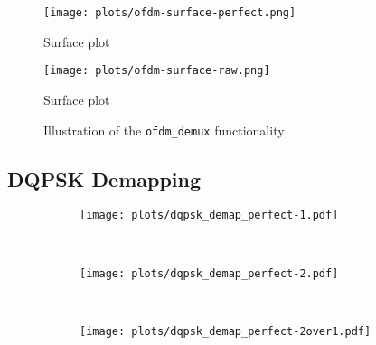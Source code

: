 \documentclass[class=report,11pt,crop=false]{standalone}
\begin{document}
\begin{figure}[htbp]
  \centering
  \captionsetup{type=figure}
  \texttt{[image: plots/ofdm-surface-perfect.png]}
  \caption{Surface plot}
  \label{fig:ofdm-surface-perfect}
\end{figure}

\begin{figure}[htbp]
  \centering
  \captionsetup{type=figure}
  \texttt{[image: plots/ofdm-surface-raw.png]}
  \caption{Surface plot}
  \label{fig:ofdm-surface-raw}
\end{figure}



\begin{figure}[htbp]
  \centering
  \captionsetup{type=figure}
  \def\svgwidth{\linewidth}
  { %
      }
  \caption{Illustration of the \texttt{ofdm\_demux} functionality}
  \label{fig:ofdm_demux}
\end{figure}



\subsection{DQPSK Demapping \label{subsect:dab-proc_dqpsk-demap}}

\begin{figure}[htbp]
  \centering
  \captionsetup{type=figure}
  \begin{subfigure}[t]{0.3\textwidth}
    \centering
    \captionsetup{type=figure}
    \texttt{[image: plots/dqpsk\_demap\_perfect-1.pdf]}
    \caption{}
    \label{fig:dqpsk_demap_perfect-1}
  \end{subfigure}%
  ~ 
  \begin{subfigure}[t]{0.3\textwidth}
    \centering
    \captionsetup{type=figure}
    \texttt{[image: plots/dqpsk\_demap\_perfect-2.pdf]}
    \caption{}
    \label{fig:dqpsk_demap_perfect-2}
  \end{subfigure}
  ~ 
  \begin{subfigure}[t]{0.3\textwidth}
    \centering
    \captionsetup{type=figure}
    \texttt{[image: plots/dqpsk\_demap\_perfect-2over1.pdf]}
    \caption{}
    \label{fig:dqpsk_demap_perfect-2over1}
  \end{subfigure}
  \caption{}
  \label{fig:dqpsk_demap_perfect}
\end{figure}
\end{document}
